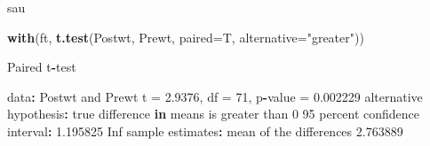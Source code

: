 \documentclass[]{article}
\newenvironment{Shaded}{\begin{snugshade}}{\end{snugshade}}
\newcommand{\KeywordTok}[1]{\textcolor[rgb]{0.13,0.29,0.53}{\textbf{#1}}}
\newcommand{\DataTypeTok}[1]{\textcolor[rgb]{0.13,0.29,0.53}{#1}}
\newcommand{\DecValTok}[1]{\textcolor[rgb]{0.00,0.00,0.81}{#1}}
\newcommand{\FloatTok}[1]{\textcolor[rgb]{0.00,0.00,0.81}{#1}}
\newcommand{\StringTok}[1]{\textcolor[rgb]{0.31,0.60,0.02}{#1}}
\newcommand{\OtherTok}[1]{\textcolor[rgb]{0.56,0.35,0.01}{#1}}
\newcommand{\ControlFlowTok}[1]{\textcolor[rgb]{0.13,0.29,0.53}{\textbf{#1}}}
\newcommand{\OperatorTok}[1]{\textcolor[rgb]{0.81,0.36,0.00}{\textbf{#1}}}
\newcommand{\NormalTok}[1]{#1}
\begin{document}
sau

\begin{Shaded}
\begin{Highlighting}[]
\KeywordTok{with}\NormalTok{(ft, }\KeywordTok{t.test}\NormalTok{(Postwt, Prewt, }\DataTypeTok{paired=}\NormalTok{T, }\DataTypeTok{alternative=}\StringTok{"greater"}\NormalTok{))}

\NormalTok{    Paired t}\OperatorTok{-}\NormalTok{test}

\NormalTok{data}\OperatorTok{:}\StringTok{  }\NormalTok{Postwt and Prewt}
\NormalTok{t =}\StringTok{ }\FloatTok{2.9376}\NormalTok{, df =}\StringTok{ }\DecValTok{71}\NormalTok{, p}\OperatorTok{-}\NormalTok{value =}\StringTok{ }\FloatTok{0.002229}
\NormalTok{alternative hypothesis}\OperatorTok{:}\StringTok{ }\NormalTok{true difference }\ControlFlowTok{in}\NormalTok{ means is greater than }\DecValTok{0}
\DecValTok{95}\NormalTok{ percent confidence interval}\OperatorTok{:}
\StringTok{ }\FloatTok{1.195825}      \OtherTok{Inf}
\NormalTok{sample estimates}\OperatorTok{:}
\NormalTok{mean of the differences }
               \FloatTok{2.763889} 
\end{Highlighting}
\end{Shaded}
\end{document}
